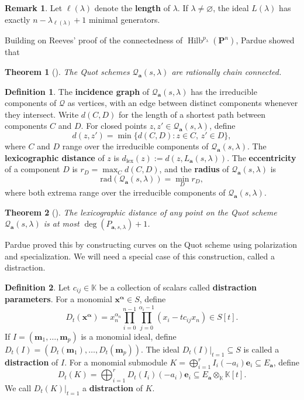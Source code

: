 \documentclass[leqno,11pt,a4paper]{amsart}
\newtheorem{thm}{Theorem}[section]
\theoremstyle{definition}
\newtheorem{remark}[remark]{Remark}
\newtheorem{definition}[definition]{Definition}
\numberwithin{equation}{section}
\newcommand{\kk}{\mathbb{K}}
\newcommand{\bfa}{\mathbf{a}}
\newcommand{\rad}{\mathrm{rad}}
\newcommand{\PP}{\mathbf{P}}
\newcommand{\bfx}{\boldsymbol{x}}
\newcommand{\bfe}{\mathbf{e}}
\newcommand{\QQ}{\mathcal{Q}}
\DeclareMathOperator{\Hilb}{Hilb}
\begin{document}
\begin{remark} \label{mingen} Let $\ell(\lambda)$ denote the \textbf{length} of $\lambda$. 
If $\lambda \ne \varnothing$, the ideal $L(\lambda)$ has exactly $n-\lambda_{\ell(\lambda)}+1$ minimal generators.
\end{remark}

Building on Reeves' proof of the connectedness of $\Hilb^{p_\lambda}(\PP^n)$, Pardue showed that

\begin{thm}[{\cite{Pardue}}] \label{Pardue_conn} The Quot schemes $\QQ_{\bfa}(s,\lambda)$ are rationally chain connected.
\end{thm}

\begin{definition} \label{radius_defn}
The \textbf{incidence graph} of $\QQ_{\bfa}(s,\lambda)$ has the irreducible components of $\QQ$ as vertices, with an edge between distinct components whenever they intersect.
Write $d(C,D)$ for the length of a shortest path between components $C$ and $D$.
For closed points $z,z' \in\QQ_{\bfa}(s,\lambda)$, define
$$
d(z,z')=
\min \{d(C,D): z \in C, \, z' \in D\},
$$
where $C$ and $D$ range over the irreducible components of $\QQ_{\bfa}(s,\lambda)$.
The \textbf{lexicographic distance} of $z$ is $d_{\text{lex}}(z) := d(z,L_{\bfa}(s,\lambda))$.
The \textbf{eccentricity} of a component $D$ is
$r_D=\max_C d(C,D)$, and the \textbf{radius} of $\QQ_{\bfa}(s,\lambda)$ is
$$
\rad(\QQ_{\bfa}(s,\lambda))=\min_D r_D,
$$
where both extrema range over the irreducible components of $\QQ_{\bfa}(s,\lambda)$. 
\end{definition}

\begin{thm}[{\cite{Reeves_radius, Pardue}}] \label{Reeves_Pardue} 
The lexicographic distance of any point on the Quot scheme $\QQ_{\bfa}(s,\lambda)$ is at most $\deg(P_{\bfa,s,\lambda}) +1$. 
\end{thm}

Pardue proved this by constructing curves on the Quot scheme using polarization and specialization. 
We will need a special case of this construction, called a distraction.

\begin{definition}\label{def:distraction}
Let $c_{ij}\in\kk$ be a collection of scalars called \textbf{distraction parameters}.
For a monomial $\bfx^{\boldsymbol{\alpha}} \in S$, define
$$
D_t(\bfx^{\boldsymbol{\alpha}}) = x_n^{\alpha_n}\prod_{i=0}^{n-1}\prod_{j=0}^{\alpha_i-1}(x_i-tc_{ij}x_n) \in S[t].
$$
If $I=(\boldsymbol{m}_1,\dots,\boldsymbol{m}_p)$ is a monomial ideal, define $D_t(I)=(D_t(\boldsymbol{m}_1),\ldots,D_t(\boldsymbol{m}_p))$. 
The ideal $D_t(I)|_{t=1} \subseteq S$ is called a \textbf{distraction} of $I$.
For a monomial submodule
$K=\bigoplus_{i=1}^r I_i(-a_i)\bfe_i\subseteq E_{\bfa}$,
define
$$
D_t(K)=\bigoplus_{i=1}^r D_t(I_i)(-a_i)\bfe_i \subseteq E_{\bfa}\otimes_\kk \kk[t].
$$
We call $D_t(K)|_{t=1}$ a \textbf{distraction} of $K$.
\end{definition}
\end{document}
